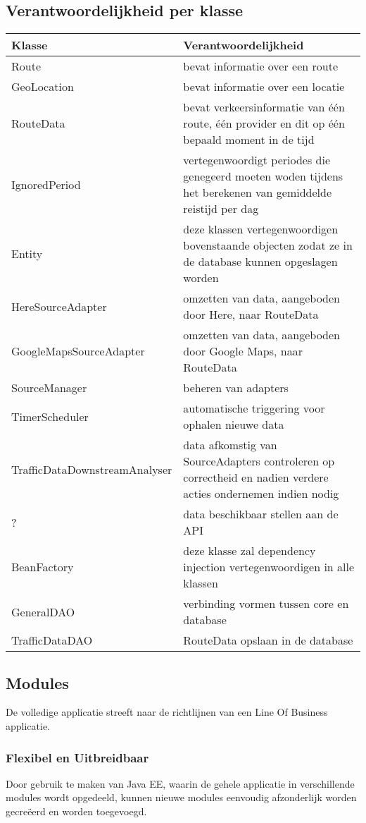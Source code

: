 \documentclass[ps,a4paper,oneside]{report}
\begin{document}
\subsection{Verantwoordelijkheid per klasse}
\begin{tabular}{ | l | p{6.5cm}| }
	\hline
	\textbf{Klasse} & \textbf{Verantwoordelijkheid} \\
	\hline
	Route & bevat informatie over een route \\
	\hline
	GeoLocation & bevat informatie over een locatie \\
	\hline
	RouteData & bevat verkeersinformatie van \'e\'en route, \'e\'en provider en dit op \'e\'en bepaald moment in de tijd \\
	\hline
	IgnoredPeriod & vertegenwoordigt periodes die genegeerd moeten woden tijdens het berekenen van gemiddelde reistijd per dag\\
	\hline
	[Object]Entity & deze klassen vertegenwoordigen bovenstaande objecten zodat ze in de database kunnen opgeslagen worden\\
	\hline
	HereSourceAdapter & omzetten van data, aangeboden door Here, naar RouteData\\	
	\hline
	GoogleMapsSourceAdapter & omzetten van data, aangeboden door Google Maps, naar RouteData\\	
	\hline
	SourceManager & beheren van adapters\\	
	\hline
	TimerScheduler & automatische triggering voor ophalen nieuwe data\\	
	\hline
	TrafficDataDownstreamAnalyser & data afkomstig van SourceAdapters controleren op correctheid en nadien verdere acties ondernemen indien nodig\\	
	\hline
	? & data beschikbaar stellen aan de API\\	
	\hline
	BeanFactory & deze klasse zal dependency injection vertegenwoordigen in alle klassen \\	
	\hline
	GeneralDAO & verbinding vormen tussen core en database\\	
	\hline
	TrafficDataDAO & RouteData opslaan in de database\\	
	\hline
\end{tabular}
\subsection{Modules}
De volledige applicatie streeft naar de richtlijnen van een Line Of Business applicatie. 
\subsubsection{Flexibel en Uitbreidbaar}
Door gebruik te maken van Java EE, waarin de gehele applicatie in verschillende modules wordt opgedeeld, kunnen nieuwe modules eenvoudig afzonderlijk worden gecreëerd en worden toegevoegd. 
\end{document}
